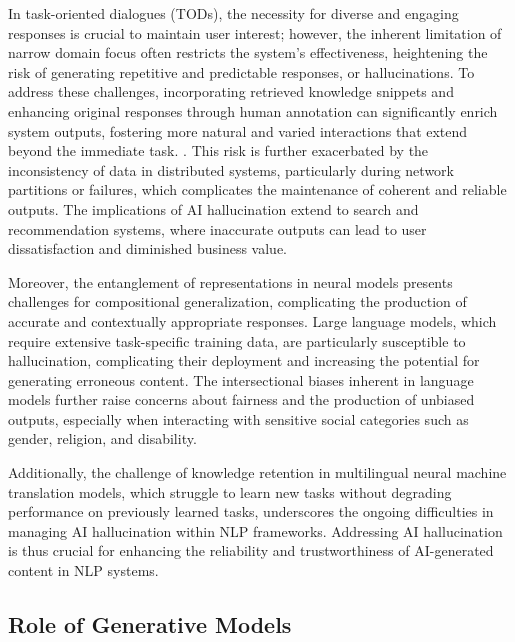 In task-oriented dialogues (TODs), the necessity for diverse and engaging responses is crucial to maintain user interest; however, the inherent limitation of narrow domain focus often restricts the system's effectiveness, heightening the risk of generating repetitive and predictable responses, or hallucinations. To address these challenges, incorporating retrieved knowledge snippets and enhancing original responses through human annotation can significantly enrich system outputs, fostering more natural and varied interactions that extend beyond the immediate task. \cite{stricker2024enhancingtaskorienteddialogueschitchat}. This risk is further exacerbated by the inconsistency of data in distributed systems, particularly during network partitions or failures, which complicates the maintenance of coherent and reliable outputs. The implications of AI hallucination extend to search and recommendation systems, where inaccurate outputs can lead to user dissatisfaction and diminished business value.



Moreover, the entanglement of representations in neural models presents challenges for compositional generalization, complicating the production of accurate and contextually appropriate responses. Large language models, which require extensive task-specific training data, are particularly susceptible to hallucination, complicating their deployment and increasing the potential for generating erroneous content. The intersectional biases inherent in language models further raise concerns about fairness and the production of unbiased outputs, especially when interacting with sensitive social categories such as gender, religion, and disability. 



Additionally, the challenge of knowledge retention in multilingual neural machine translation models, which struggle to learn new tasks without degrading performance on previously learned tasks, underscores the ongoing difficulties in managing AI hallucination within NLP frameworks. Addressing AI hallucination is thus crucial for enhancing the reliability and trustworthiness of AI-generated content in NLP systems.



\subsection{Role of Generative Models} \label{subsec:Role of Generative Models}

